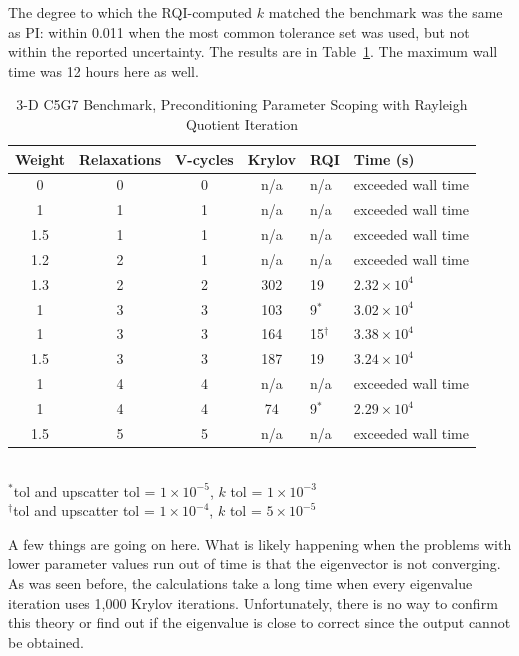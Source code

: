 The degree to which the RQI-computed $k$ matched the benchmark was the same as PI: within 0.011 when the most common tolerance set was used, but not within the reported uncertainty. The results are in Table~\ref{table:3-D c5g7 rqi}. The maximum wall time was 12 hours here as well. 
%
\begin{table}[!h]
\caption{3-D C5G7 Benchmark, Preconditioning Parameter Scoping with Rayleigh Quotient Iteration}
\begin{center}
\begin{tabular}{c c c c l l}
\hline
Weight & Relaxations & V-cycles & Krylov & RQI & Time (s) \\[0.5ex]
\hline
0    & 0 & 0 & n/a     & n/a          & exceeded wall time \\
1    & 1 & 1 & n/a     & n/a          & exceeded wall time \\
1.5 & 1 & 1 & n/a     & n/a          & exceeded wall time \\
1.2 & 2 & 1 & n/a     & n/a          & exceeded wall time \\
1.3 & 2 & 2 & 302    & 19           & $2.32 \times 10^{4}$ \\
1    & 3 & 3 & 103    & 9$^{*}$    & $3.02 \times 10^{4}$ \\
1    & 3 & 3 & 164    & 15$^{\dag}$ & $3.38 \times 10^{4}$ \\
1.5 & 3 & 3 & 187    & 19           & $3.24 \times 10^{4}$ \\
1    & 4 & 4 & n/a     & n/a          & exceeded wall time \\
1    & 4 & 4 & 74     & 9$^{*}$    & $2.29 \times 10^{4}$ \\
1.5 & 5 & 5 & n/a     & n/a          & exceeded wall time \\
\hline 
\end{tabular}\\
$^{*}$tol and upscatter tol = $1 \times 10^{-5}$, $k$ tol = $1 \times 10^{-3}$\\
$^{\dag}$tol and upscatter tol = $1 \times 10^{-4}$, $k$ tol = $5 \times 10^{-5}$
\end{center}
\label{table:3-D c5g7 rqi}
\end{table}  

A few things are going on here. What is likely happening when the problems with lower parameter values run out of time is that the eigenvector is not converging. As was seen before, the calculations take a long time when every eigenvalue iteration uses 1,000 Krylov iterations. Unfortunately, there is no way to confirm this theory or find out if the eigenvalue is close to correct since the output cannot be obtained. 

